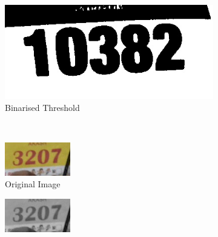 \begin{figure}[h]
\begin{subfigure}[b]{0.23\textwidth}
  \end{subfigure}
  \hspace{\fill}
  \begin{subfigure}[b]{0.23\textwidth}
    \includegraphics[width=\textwidth]{images/processing/ocr/10382_inv}
    \caption{Binarised Threshold}
  \end{subfigure}
  \\ \bigskip
  \hspace{\fill}
  \begin{subfigure}[b]{0.23\textwidth}
    \includegraphics[width=\textwidth]{images/processing/ocr/3207_org}
    \caption{Original Image}
  \end{subfigure}
  \hspace{\fill}
  \begin{subfigure}[b]{0.23\textwidth}
    \includegraphics[width=\textwidth]{images/processing/ocr/3207_bw}

\end{subfigure}
\end{figure}
